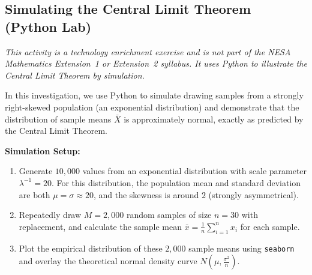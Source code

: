 
\subsection{Simulating the Central Limit Theorem (Python Lab)}
\label{subsec:clt-python}

\textit{This activity is a technology enrichment exercise and is not part
of the NESA Mathematics Extension~1 or Extension~2 syllabus. It uses
Python to illustrate the Central Limit Theorem by simulation.}

In this investigation, we use Python to simulate drawing samples from a strongly right-skewed population (an exponential distribution) and demonstrate that the distribution of sample means $\bar{X}$ is approximately normal, exactly as predicted by the Central Limit Theorem.

\textbf{Simulation Setup:}
\begin{enumerate}[leftmargin=*]
  \item Generate $10{,}000$ values from an exponential distribution with scale parameter $\lambda^{-1} = 20$. For this distribution, the population mean and standard deviation are both $\mu = \sigma \approx 20$, and the skewness is around $2$ (strongly asymmetrical).
  \item Repeatedly draw $M = 2{,}000$ random samples of size $n = 30$ with replacement, and calculate the sample mean $\bar{x} = \frac{1}{n}\sum_{i=1}^n x_i$ for each sample.
  \item Plot the empirical distribution of these $2{,}000$ sample means using \texttt{seaborn} and overlay the theoretical normal density curve $N\!\left(\mu, \frac{\sigma^2}{n}\right)$.
\end{enumerate}

